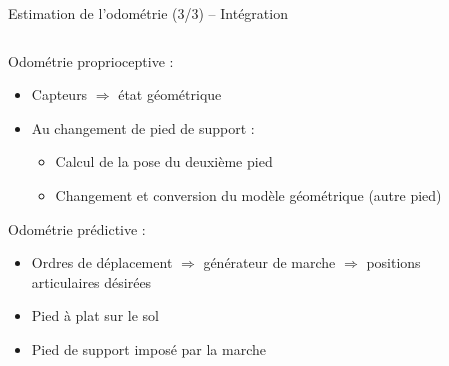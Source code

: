 \begin{frame}{Estimation de l'odométrie (3/3) -- Intégration}
    \begin{columns}
        \begin{column}{0.5\linewidth}
            Odométrie proprioceptive :
            \begin{itemize}
                \item Capteurs $\Rightarrow$ état géométrique
                \item Au changement de pied de support :
                    \begin{itemize}
                        \item Calcul de la pose du deuxième pied
                        \item Changement et conversion du modèle géométrique (autre pied)
                    \end{itemize}
            \end{itemize}
            \vspace{1.0em}
            Odométrie prédictive :
            \begin{itemize}
                \item Ordres de déplacement $\Rightarrow$ générateur de marche $\Rightarrow$
                    positions articulaires désirées
                \item Pied à plat sur le sol
                \item Pied de support imposé par la marche
            \end{itemize}
        \end{column}
        \begin{column}{0.5\linewidth}
            \centering
        \end{column}
    \end{columns}
\end{frame}

